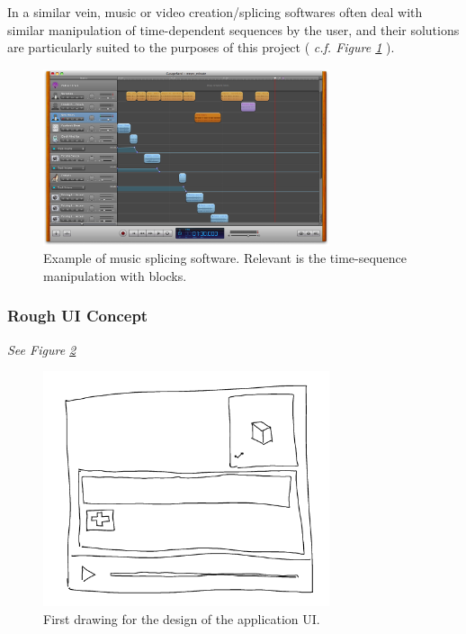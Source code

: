 In a similar vein, music or video creation/splicing softwares often deal with similar manipulation of time-dependent sequences by the user, and their solutions are particularly suited to the purposes of this project ( \textit{c.f. Figure \ref{img:MusicEditor}} ).\\

\begin{figure}[ht]
   \centering
   \includegraphics[width=0.75\textwidth]{img/MusicEditor.png}
   \caption{Example of music splicing software. Relevant is the time-sequence manipulation with blocks.}
   \label{img:MusicEditor}
\end{figure}


\subsubsection{Rough UI Concept}

\textit{See Figure \ref{img:AppConcept}}

\begin{figure}[ht]
   \centering
   \includegraphics[width=0.75\textwidth]{img/AppConcept.png}
   \caption{First drawing for the design of the application UI.}
   \label{img:AppConcept}
\end{figure}

